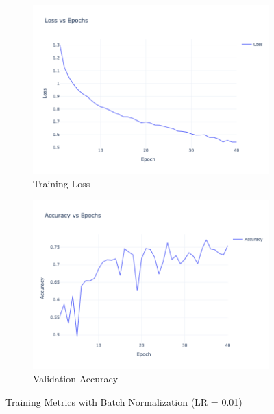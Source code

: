 \begin{figure}[htbp!]
    \centering
    \begin{subfigure}{0.48\textwidth}
    \centering
    \includegraphics[width=\textwidth]{images/CNN-3-train-loss-with-batchnorm.png}
    \caption{Training Loss}
    \end{subfigure}
    \begin{subfigure}{0.48\textwidth}
    \centering
    \includegraphics[width=\textwidth]{images/CNN-3-valid-accuracy-with-batchnorm.png}
    \caption{Validation Accuracy}
    \end{subfigure}
    \caption{Training Metrics with Batch Normalization (LR = 0.01)}
    \label{fig:metrics_with_batchnorm}
    \end{figure}